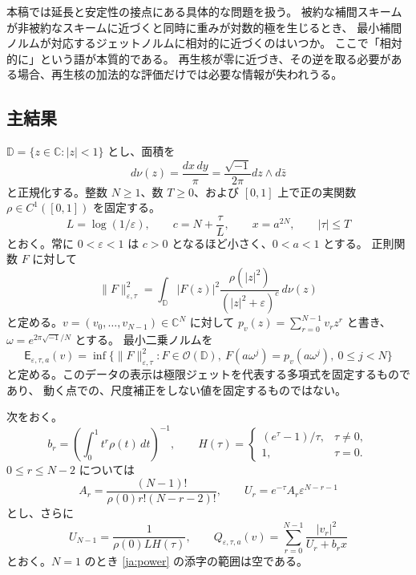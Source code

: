 \documentclass[12pt]{amsart}
\theoremstyle{definition}
\theoremstyle{remark}
\numberwithin{equation}{section}
\newcommand{\cO}{\mathcal{O}}
\newcommand{\C}{\mathbb{C}}
\newcommand{\D}{\mathbb{D}}
\newcommand{\Cost}{\mathsf E}
\theoremstyle{definition}
\begin{document}
本稿では延長と安定性の接点にある具体的な問題を扱う。
被約な補間スキームが非被約なスキームに近づくと同時に重みが対数的極を生じるとき、
最小補間ノルムが対応するジェットノルムに相対的に近づくのはいつか。
ここで「相対的に」という語が本質的である。
再生核が零に近づき、その逆を取る必要がある場合、再生核の加法的な評価だけでは必要な情報が失われうる。

\subsection{主結果}
$\D=\{z\in\C:|z|<1\}$ とし、面積を
\begin{equation}\label{ja:area}
 d\nu(z)=\frac{dx\,dy}{\pi}=\frac{\sqrt{-1}}{2\pi}dz\wedge d\bar z
\end{equation}
と正規化する。整数 $N\ge1$、数 $T\ge0$、および $[0,1]$ 上で正の実関数
$\rho\in C^1([0,1])$ を固定する。
\begin{equation}\label{ja:parameters}
 L=\log(1/\varepsilon),\qquad
 c=N+\frac{\tau}{L},\qquad x=a^{2N},\qquad |\tau|\le T
\end{equation}
とおく。常に $0<\varepsilon<1$ は $c>0$ となるほど小さく、$0<a<1$ とする。
正則関数 $F$ に対して
\begin{equation}\label{ja:norm}
 \|F\|_{\varepsilon,\tau}^2
 =\int_\D |F(z)|^2\frac{\rho(|z|^2)}{(|z|^2+\varepsilon)^c}\,d\nu(z)
\end{equation}
と定める。$v=(v_0,\ldots,v_{N-1})\in\C^N$ に対して
$p_v(z)=\sum_{r=0}^{N-1}v_rz^r$ と書き、$\omega=e^{2\pi\sqrt{-1}/N}$ とする。
最小二乗ノルムを
\begin{equation}\label{ja:cost}
 \Cost_{\varepsilon,\tau,a}(v)
 =\inf\{\|F\|_{\varepsilon,\tau}^2:
 F\in\cO(\D),\ F(a\omega^j)=p_v(a\omega^j),\ 0\le j<N\}
\end{equation}
と定める。このデータの表示は極限ジェットを代表する多項式を固定するものであり、
動く点での、尺度補正をしない値を固定するものではない。

次をおく。
\begin{equation}\label{ja:constants}
 b_r=\left(\int_0^1t^r\rho(t)\,dt\right)^{-1},\qquad
 H(\tau)=\begin{cases}(e^\tau-1)/\tau,&\tau\ne0,\\1,&\tau=0.\end{cases}
\end{equation}
$0\le r\le N-2$ については
\begin{equation}\label{ja:power}
 A_r=\frac{(N-1)!}{\rho(0)r!(N-r-2)!},\qquad
 U_r=e^{-\tau}A_r\varepsilon^{N-r-1}
\end{equation}
とし、さらに
\begin{equation}\label{ja:critical}
 U_{N-1}=\frac{1}{\rho(0)LH(\tau)},\qquad
 Q_{\varepsilon,\tau,a}(v)=\sum_{r=0}^{N-1}\frac{|v_r|^2}{U_r+b_rx}
\end{equation}
とおく。$N=1$ のとき \eqref{ja:power} の添字の範囲は空である。
\end{document}
